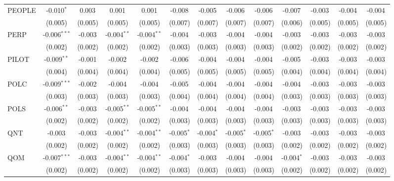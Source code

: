 \begin{table}[!htbp]
\begin{tabular}{@{\extracolsep{5pt}}lcccccccccccc}
 PEOPLE & -0.010$^{*}$ & 0.003$^{}$ & 0.001$^{}$ & 0.001$^{}$ & -0.008$^{}$ & -0.005$^{}$ & -0.006$^{}$ & -0.006$^{}$ & -0.007$^{}$ & -0.003$^{}$ & -0.004$^{}$ & -0.004$^{}$ \\
  & (0.005) & (0.005) & (0.005) & (0.005) & (0.007) & (0.007) & (0.007) & (0.007) & (0.006) & (0.005) & (0.005) & (0.005) \\
 PERP & -0.006$^{***}$ & -0.003$^{}$ & -0.004$^{**}$ & -0.004$^{**}$ & -0.004$^{}$ & -0.003$^{}$ & -0.004$^{}$ & -0.004$^{}$ & -0.003$^{}$ & -0.003$^{}$ & -0.003$^{}$ & -0.003$^{}$ \\
  & (0.002) & (0.002) & (0.002) & (0.002) & (0.003) & (0.003) & (0.003) & (0.003) & (0.002) & (0.002) & (0.002) & (0.002) \\
 PILOT & -0.009$^{**}$ & -0.001$^{}$ & -0.002$^{}$ & -0.002$^{}$ & -0.006$^{}$ & -0.004$^{}$ & -0.004$^{}$ & -0.004$^{}$ & -0.005$^{}$ & -0.003$^{}$ & -0.003$^{}$ & -0.003$^{}$ \\
  & (0.004) & (0.004) & (0.004) & (0.004) & (0.005) & (0.005) & (0.005) & (0.005) & (0.004) & (0.004) & (0.004) & (0.004) \\
 POLC & -0.009$^{***}$ & -0.002$^{}$ & -0.004$^{}$ & -0.004$^{}$ & -0.005$^{}$ & -0.004$^{}$ & -0.004$^{}$ & -0.004$^{}$ & -0.004$^{}$ & -0.003$^{}$ & -0.003$^{}$ & -0.003$^{}$ \\
  & (0.003) & (0.003) & (0.003) & (0.003) & (0.004) & (0.004) & (0.004) & (0.004) & (0.003) & (0.003) & (0.003) & (0.003) \\
 POLS & -0.006$^{**}$ & -0.003$^{}$ & -0.005$^{**}$ & -0.005$^{**}$ & -0.004$^{}$ & -0.004$^{}$ & -0.004$^{}$ & -0.004$^{}$ & -0.003$^{}$ & -0.003$^{}$ & -0.003$^{}$ & -0.003$^{}$ \\
  & (0.002) & (0.002) & (0.002) & (0.002) & (0.003) & (0.003) & (0.003) & (0.003) & (0.003) & (0.003) & (0.003) & (0.003) \\
 QNT & -0.003$^{}$ & -0.003$^{}$ & -0.004$^{**}$ & -0.004$^{**}$ & -0.005$^{*}$ & -0.004$^{*}$ & -0.005$^{*}$ & -0.005$^{*}$ & -0.003$^{}$ & -0.003$^{}$ & -0.003$^{}$ & -0.003$^{}$ \\
  & (0.002) & (0.002) & (0.002) & (0.002) & (0.003) & (0.003) & (0.003) & (0.003) & (0.002) & (0.002) & (0.002) & (0.002) \\
 QOM & -0.007$^{***}$ & -0.003$^{}$ & -0.004$^{**}$ & -0.004$^{**}$ & -0.004$^{*}$ & -0.003$^{}$ & -0.004$^{}$ & -0.004$^{}$ & -0.004$^{*}$ & -0.003$^{}$ & -0.003$^{}$ & -0.003$^{}$ \\
  & (0.002) & (0.002) & (0.002) & (0.002) & (0.003) & (0.003) & (0.003) & (0.003) & (0.002) & (0.002) & (0.002) & (0.002) \\

\end{tabular}
\end{table}
